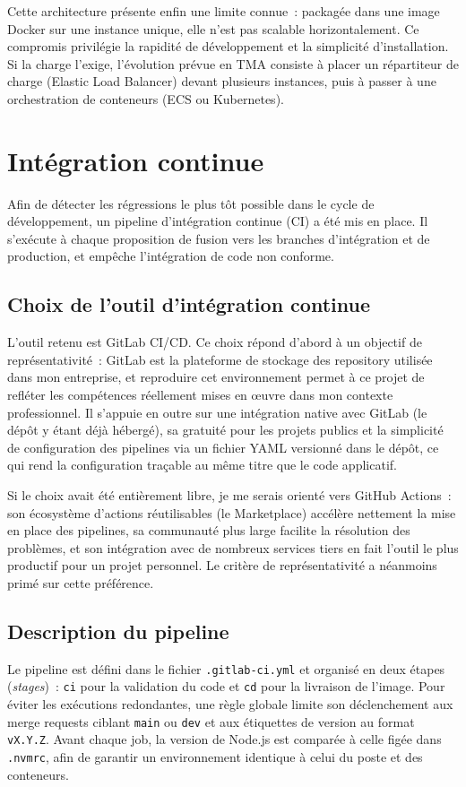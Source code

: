 Cette architecture présente enfin une limite connue~: packagée dans une image Docker sur une instance unique, elle n'est pas scalable horizontalement. Ce compromis privilégie la rapidité de développement et la simplicité d'installation. Si la charge l'exige, l'évolution prévue en TMA consiste à placer un répartiteur de charge (Elastic Load Balancer) devant plusieurs instances, puis à passer à une orchestration de conteneurs (ECS ou Kubernetes).

\section{Intégration continue}

Afin de détecter les régressions le plus tôt possible dans le cycle de développement, un pipeline d'intégration continue (CI) a été mis en place. Il s'exécute à chaque proposition de fusion vers les branches d'intégration et de production, et empêche l'intégration de code non conforme.

\subsection{Choix de l'outil d'intégration continue}
L'outil retenu est GitLab CI/CD. Ce choix répond d'abord à un objectif de représentativité~: GitLab est la plateforme de stockage des repository utilisée dans mon entreprise, et reproduire cet environnement permet à ce projet de refléter les compétences réellement mises en œuvre dans mon contexte professionnel. Il s'appuie en outre sur une intégration native avec GitLab (le dépôt y étant déjà hébergé), sa gratuité pour les projets publics et la simplicité de configuration des pipelines via un fichier YAML versionné dans le dépôt, ce qui rend la configuration traçable au même titre que le code applicatif.

Si le choix avait été entièrement libre, je me serais orienté vers GitHub Actions~: son écosystème d'actions réutilisables (le Marketplace) accélère nettement la mise en place des pipelines, sa communauté plus large facilite la résolution des problèmes, et son intégration avec de nombreux services tiers en fait l'outil le plus productif pour un projet personnel. Le critère de représentativité a néanmoins primé sur cette préférence.

\subsection{Description du pipeline}\label{subsec:ci-pipeline}
Le pipeline est défini dans le fichier \texttt{.gitlab-ci.yml} et organisé en deux étapes (\emph{stages})~: \texttt{ci} pour la validation du code et \texttt{cd} pour la livraison de l'image. Pour éviter les exécutions redondantes, une règle globale limite son déclenchement aux merge requests ciblant \texttt{main} ou \texttt{dev} et aux étiquettes de version au format \texttt{vX.Y.Z}. Avant chaque job, la version de Node.js est comparée à celle figée dans \texttt{.nvmrc}, afin de garantir un environnement identique à celui du poste et des conteneurs.


